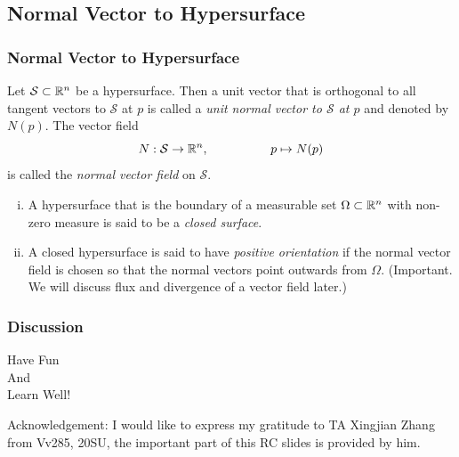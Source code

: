 \documentclass[12pt, t]{beamer}
\renewcommand{\emph}[1]{{\color{Turquoise3}\textsl{#1}}}
\begin{document}
\subsection{Normal Vector to Hypersurface}
\begin{frame}
    \frametitle{Normal Vector to Hypersurface}
    Let $\mathcal{S}\subset\mathbb{R}^n$ be a hypersurface. Then a unit vector that is orthogonal to all tangent vectors to $\mathcal{S}$ at $p$ is called a \emph{unit normal vector to $\mathcal{S}$ at $p$} and denoted by $N(p)$. The vector field
    \[N:\mathcal{S}\to\mathbb{R}^n,\qquad\qquad\quad
        p\mapsto N(p)\]
    is called the \emph{normal vector field} on $\mathcal{S}$.

    \begin{enumerate}[(i)]
        \item A hypersurface that is the boundary of a measurable set $\Omega\subset\mathbb{R}^n$ with non-zero measure is said to be a \emph{closed surface}.
        \item A closed hypersurface is said to have \emph{positive orientation} if the
              normal vector field is chosen so that the normal vectors point
              outwards from $\Omega$. (Important. We will discuss flux and divergence of a vector field later.)
    \end{enumerate}
\end{frame}


\begin{frame}
    \frametitle{Discussion}
    \vspace{1cm}
    \begin{center}
        \LARGE
        Have Fun\\
        And\\
        Learn Well!
    \end{center}
    \vspace{2cm}
    \footnotesize Acknowledgement: I would like to express my gratitude to TA Xingjian Zhang from Vv285, 20SU, the important part of this RC slides is provided by him.
\end{frame}
\end{document}
